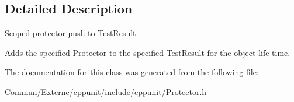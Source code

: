 \subsection{Detailed Description}
Scoped protector push to \hyperlink{class_test_result}{Test\+Result}. 

Adds the specified \hyperlink{class_protector}{Protector} to the specified \hyperlink{class_test_result}{Test\+Result} for the object life-\/time. 

The documentation for this class was generated from the following file\+:\begin{DoxyCompactItemize}
\item 
Commun/\+Externe/cppunit/include/cppunit/Protector.\+h\end{DoxyCompactItemize}
